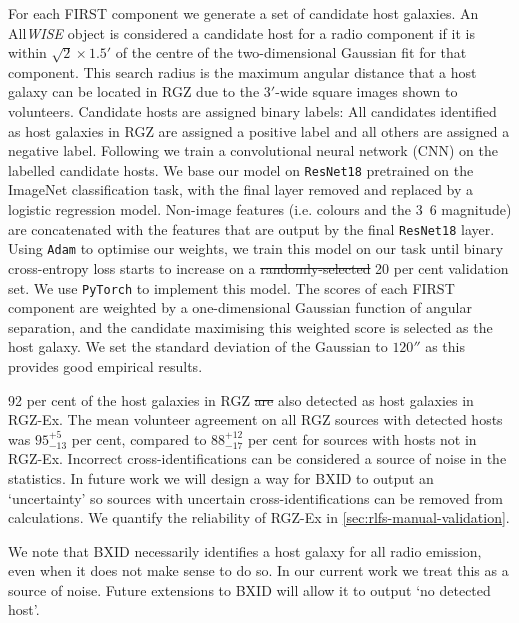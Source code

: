 \documentclass[11pt, a4paper]{book}
\providecommand{\DIFaddtex}[1]{{\protect\color{blue}\uwave{#1}}} %
\providecommand{\DIFdeltex}[1]{{\protect\color{red}\sout{#1}}}                      %
\providecommand{\DIFaddbegin}{} %
\providecommand{\DIFaddend}{} %
\providecommand{\DIFdelbegin}{} %
\providecommand{\DIFdelend}{} %
\providecommand{\DIFadd}[1]{\texorpdfstring{\DIFaddtex{#1}}{#1}} %
\providecommand{\DIFdel}[1]{\texorpdfstring{\DIFdeltex{#1}}{}} %
\newcommand{\DIFscaledelfig}{0.5}
\newlength{\DIFdelgraphicswidth} %
\newlength{\DIFdelgraphicsheight} %
\newcommand{\DIFaddincludegraphics}[2][]{{\color{blue}\fbox{\DIFOincludegraphics[#1]{#2}}}} %
\newcommand{\DIFdelincludegraphics}[2][]{%
\sbox{\DIFdelgraphicsbox}{\DIFOincludegraphics[#1]{#2}}%
\settoboxwidth{\DIFdelgraphicswidth}{\DIFdelgraphicsbox} %
\settoboxtotalheight{\DIFdelgraphicsheight}{\DIFdelgraphicsbox} %
\scalebox{\DIFscaledelfig}{%
\parbox[b]{\DIFdelgraphicswidth}{\usebox{\DIFdelgraphicsbox}\\[-\baselineskip] \rule{\DIFdelgraphicswidth}{0em}}\llap{\resizebox{\DIFdelgraphicswidth}{\DIFdelgraphicsheight}{%
\setlength{\unitlength}{\DIFdelgraphicswidth}%
\begin{picture}(1,1)%
\thicklines\linethickness{2pt} %
{\color[rgb]{1,0,0}\put(0,0){\framebox(1,1){}}}%
{\color[rgb]{1,0,0}\put(0,0){\line( 1,1){1}}}%
{\color[rgb]{1,0,0}\put(0,1){\line(1,-1){1}}}%
\end{picture}%
}\hspace*{3pt}}} %
} %
\DeclareRobustCommand{\DIFaddbegin}{\DIFOaddbegin \let\includegraphics\DIFaddincludegraphics} %
\DeclareRobustCommand{\DIFaddend}{\DIFOaddend \let\includegraphics\DIFOincludegraphics} %
\DeclareRobustCommand{\DIFdelbegin}{\DIFOdelbegin \let\includegraphics\DIFdelincludegraphics} %
\DeclareRobustCommand{\DIFdelend}{\DIFOaddend \let\includegraphics\DIFOincludegraphics} %
\begin{document}
For each FIRST component we generate a set of candidate host galaxies.
An All\emph{WISE} object is considered a candidate host for a radio
component if it is within $\sqrt{2} \times 1.5'$ of the centre of the two-dimensional
Gaussian fit for that component. This search radius is the maximum
angular distance that a host galaxy can be located in RGZ due to the
$3'$-wide square images shown to volunteers. Candidate hosts are
assigned binary labels: All candidates identified as host galaxies in
RGZ are assigned a positive label and all others are assigned a
negative label. Following \citet{alger18radio} we train a convolutional neural
network (CNN) on the labelled candidate hosts. We
base our model on \texttt{ResNet18} \citep{he2016resnet} pretrained on the
ImageNet classification task, with the final layer removed and replaced
by a logistic regression model. Non-image features (i.e. colours and the
\unit{3.6}{\micro\meter} magnitude) are concatenated with the features
that are output by the final \texttt{ResNet18} layer. Using \texttt{Adam}
\citep{kingma14adam} to optimise our weights, we train this model on our
task until binary cross-entropy loss starts to increase on a
\DIFdelbegin \DIFdel{randomly-selected }\DIFdelend \DIFaddbegin \DIFadd{randomly selected }\DIFaddend 20 per cent validation set. We use \texttt{PyTorch}
\citep{paszke2017pytorch} to implement this model. The scores of each FIRST
component are weighted by a one-dimensional Gaussian function of angular separation, and the
candidate maximising this weighted score is selected as the host galaxy. We
set the standard deviation of the Gaussian to $120''$ as this provides good
empirical results.

92 per cent of the host galaxies in RGZ \DIFdelbegin \DIFdel{are }\DIFdelend \DIFaddbegin \DIFadd{were }\DIFaddend also detected as host galaxies in RGZ-Ex. The mean volunteer agreement on all RGZ sources with detected hosts was $95^{+5}_{-13}$ per cent, compared to $88^{+12}_{-17}$ per cent for sources with hosts not in RGZ-Ex. Incorrect cross-identifications can be considered a source of noise in the statistics. In future work we will design a way for BXID to output an `uncertainty' so \DIFaddbegin \DIFadd{that }\DIFaddend sources with uncertain cross-identifications can be removed from calculations. We quantify the reliability of RGZ-Ex in \autoref{sec:rlfs-manual-validation}.

We note that BXID necessarily identifies a host galaxy for all radio emission, even when it does not
make sense to do so. In our current work we treat this as a source of
noise. Future extensions to BXID will allow it to output `no detected
host'.
\end{document}
